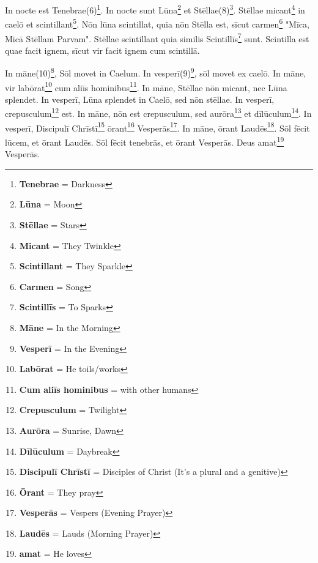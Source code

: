 In nocte est Tenebrae(6)\footnote{\textbf{Tenebrae} = Darkness}. In nocte sunt Lūna\footnote{\textbf{Lūna} = Moon} et Stēllae(8)\footnote{\textbf{Stēllae} = Stars}. Stēllae micant\footnote{\textbf{Micant} = They Twinkle} in caelō et scintillant\footnote{\textbf{Scintillant} = They Sparkle}. Nōn lūna scintillat, quia nōn Stēlla est, sīcut carmen\footnote{\textbf{Carmen} = Song} "Mīca, Micā Stēllam Parvam". Stēllae scintillant quia similis Scintillīs\footnote{\textbf{Scintillīs} = To Sparks} sunt. Scintilla est quae facit ignem, sīcut vir facit ignem cum scintillā. \par
In māne(10)\footnote{\textbf{Māne} = In the Morning}, Sōl movet in Caelum. In vesperī(9)\footnote{\textbf{Vesperī} = In the Evening}, sōl movet ex caelō. In māne, vir labōrat\footnote{\textbf{Labōrat} = He toils/works} cum aliīs hominibus\footnote{\textbf{Cum aliīs hominibus} = with other humans}. In māne, Stēllae nōn micant, nec Lūna splendet. In vesperī, Lūna splendet in Caelō, sed nōn stēllae. In vesperī, crepusculum\footnote{\textbf{Crepusculum} = Twilight} est. In māne, nōn est crepusculum, sed aurōra\footnote{\textbf{Aurōra} = Sunrise, Dawn} et dīlūculum\footnote{\textbf{Dīlūculum} = Daybreak}. In vesperī, Discipulī Chrīstī\footnote{\textbf{Discipulī Chrīstī} = Disciples of Christ (It's a plural and a genitive)} ōrant\footnote{\textbf{Ōrant} = They pray} Vesperās\footnote{\textbf{Vesperās} = Vespers (Evening Prayer)}. In māne, ōrant Laudēs\footnote{\textbf{Laudēs} = Lauds (Morning Prayer)}. Sōl fēcit lūcem, et ōrant Laudēs. Sōl fēcit tenebrās, et ōrant Vesperās. Deus amat\footnote{\textbf{amat} = He loves} Vesperās.\par